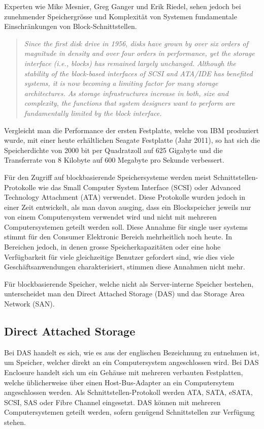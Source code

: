 Experten wie Mike Mesnier, Greg Ganger und Erik Riedel, sehen jedoch bei zunehmender Speichergrösse und Komplexität von Systemen fundamentale Einschränkungen von Block-Schnittstellen.

\begin{quotation}
\em Since the first disk drive in 1956, disks have grown by over six orders of magnitude in density and over four orders in performance, yet the storage interface (i.e., blocks) has remained largely unchanged. Although the stability of the block-based interfaces of SCSI and ATA/IDE has benefited systems, it is now becoming a limiting factor for many storage architectures. As storage infrastructures increase in both, size and complexity, the functions that system designers want to perform are fundamentally limited by the block interface. \end{quotation}\cite{Mesnier2003}

Vergleicht man die Performance der ersten Festplatte, welche von IBM produziert wurde, mit einer heute erhältlichen Seagate Festplatte (Jahr 2011), so hat sich die Speicherdichte von 2000 bit per Quadratzoll auf 625 Gigabyte und die Transferrate von 8 Kilobyte auf 600 Megabyte pro Sekunde verbessert. \cite{Seagate2011}\cite{Seagate2011a}

Für den Zugriff auf blockbasierende Speichersysteme werden meist Schnittstellen-Protokolle wie das Small Computer System Interface (SCSI) oder Advanced Technology Attachment (\gls{ATA}) verwendet. Diese Protokolle wurden jedoch in einer Zeit entwickelt, als man davon ausging, dass ein Blockspeicher jeweils nur von einem Computersystem verwendet wird und nicht mit mehreren Computersystemen geteilt werden soll. Diese Annahme für single user systems stimmt für den Consumer Elektronic Bereich mehrheitlich noch heute. In Bereichen jedoch, in denen grosse Speicherkapazitäten oder eine hohe Verfügbarkeit für viele gleichzeitige Benutzer gefordert sind, wie dies viele Geschäftsanwendungen charakterisiert, stimmen diese Annahmen nicht mehr.

Für blockbasierende Speicher, welche nicht als Server-interne Speicher bestehen, unterscheidet man den Direct Attached Storage (DAS) und das Storage Area Network (SAN). 

\subsection{Direct Attached Storage}
Bei DAS handelt es sich, wie es aus der englischen Bezeichnung zu entnehmen ist, um Speicher, welcher direkt an ein Computersystem angeschlossen wird. Bei DAS Enclosure handelt sich um ein Gehäuse mit mehreren verbauten Festplatten, welche üblicherweise über einen Host-Bus-Adapter an ein Computersytem angeschlossen werden. Als Schnittstellen-Protokoll werden \gls{ATA}, \gls{SATA}, \gls{eSATA}, \gls{SCSI}, \gls{SAS} oder Fibre Channel eingesetzt. DAS können mit mehreren Computersystemen geteilt werden, sofern genügend Schnittstellen zur Verfügung stehen.


